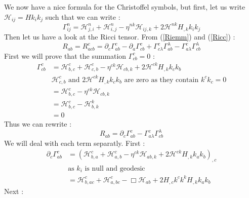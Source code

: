\documentclass[a4paper,12pt]{article}
\theoremstyle{definition}
\begin{document}
We now have a nice formula for the Christoffel symbols, but first, let us write $\mathcal{H}_{ij}=Hk_ik_j$ such that we can write :
\begin{equation}
	\Gamma^n_{ij}=\mathcal{H}^n_{j,i}+\mathcal{H}^n_{i,j}-\eta^{nk}\mathcal{H}_{ij,k}+2\mathcal{H}^{nk}H_{,k}k_ik_j
\end{equation}
Then let us have a look at the Ricci tensor. From (\ref{Riemm}) and (\ref{Ricc}) :
\begin{equation}
	R_{ab}=R^c_{acb}=\partial_c\Gamma^c_{ab}-\partial_a\Gamma^c_{cb}+\Gamma^c_{c\lambda}\Gamma^\lambda_{ab}-\Gamma^c_{a\lambda}\Gamma^\lambda_{cb}
\end{equation}
First we will prove that the summation $\Gamma^c_{cb}=0$ :
\begin{equation}
\begin{split}
	\Gamma^c_{cb}&=\mathcal{H}^c_{b,c}+\mathcal{H}^c_{c,b}-\eta^{ck}\mathcal{H}_{cb,k}+2\mathcal{H}^{ck}H_{,k}k_ck_b\\
	&\text{$\mathcal{H}^c_{c,b}$ and $2\mathcal{H}^{ck}H_{,k}k_ck_b$ are zero as they contain $k^ck_c=0$}\\
	&=\mathcal{H}^c_{b,c}-\eta^{ck}\mathcal{H}_{cb,k}\\
	&=\mathcal{H}^c_{b,c}-\mathcal{H}^k_{b,k}\\
	&=0
\end{split}
\end{equation}
Thus we can rewrite :
\begin{equation}
	R_{ab}=\partial_c\Gamma^c_{ab}-\Gamma^c_{a\lambda}\Gamma^\lambda_{cb}
\end{equation}
We will deal with each term separatly.
First :
\begin{equation}
\begin{split}
	\partial_c\Gamma^c_{ab}&=(\mathcal{H}^c_{b,a}+\mathcal{H}^c_{a,b}-\eta^{ck}\mathcal{H}_{ab,k}+2\mathcal{H}^{ck}H_{,k}k_ak_b)_{,c}\\
	&\text{as $k_i$ is null and geodesic}\\
	&=\mathcal{H}^c_{b,ac}+\mathcal{H}^c_{a,bc}-\Box\mathcal{H}_{ab}+2H_{,c}k^ck^kH_{,k}k_ak_b
\end{split}
\end{equation}
Next :
\end{document}
